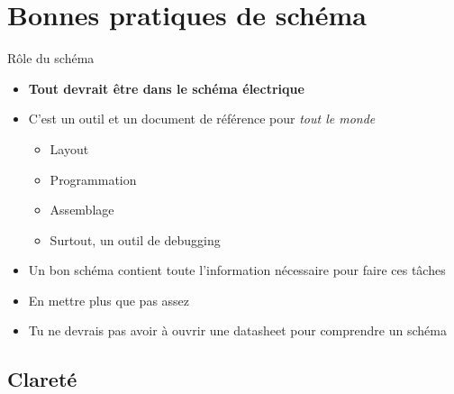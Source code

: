 
\section{Bonnes pratiques de schéma}

\begin{frame}{Rôle du schéma}
    \begin{itemize}
        \item \textbf{Tout devrait être dans le schéma électrique}
        \item C'est un outil et un document de référence pour \textit{tout le monde}
        \begin{itemize}
            \item Layout
            \item Programmation
            \item Assemblage
            \item Surtout, un outil de debugging
        \end{itemize}
        \item Un bon schéma contient toute l'information nécessaire pour faire ces tâches
        \item En mettre plus que pas assez
        \bigskip
        \item Tu ne devrais pas avoir à ouvrir une datasheet pour comprendre un schéma
    \end{itemize}
\end{frame}

\begin{frame}[plain]
\end{frame}


\subsection{Clareté}


